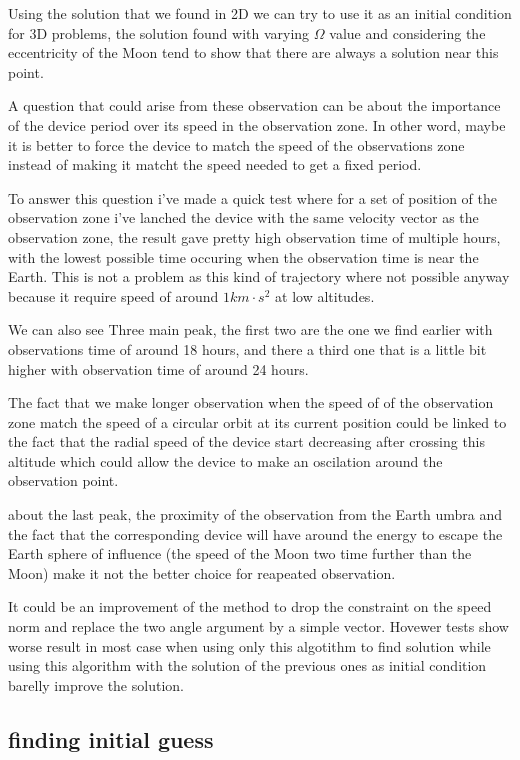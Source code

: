\documentclass{article} %
\begin{document}
		Using the solution that we found in 2D we can try to use it as an initial condition for 3D problems, the solution found with varying $\Omega$ value and considering the eccentricity of the Moon tend to show that there are always a solution near this point.
		
		A question that could arise from these observation can be about the importance of the device period over its speed in the observation zone. In other word, maybe it is better to force the device to match the speed of the observations zone instead of making it matcht the speed needed to get a fixed period.
		
		To answer this question i've made a quick test where for a set of position of the observation zone i've lanched the device with the same velocity vector as the observation zone, the result gave pretty high observation time of multiple hours, with the lowest possible time occuring when the observation time is near the Earth. This is not a problem as this kind of trajectory where not possible anyway because it require speed of around $1 km\cdot s^2$ at low altitudes.
		
		We can also see Three main peak, the first two are the one we find earlier with observations time of around 18 hours, and there a third one that is a little bit higher with observation time of around 24 hours.
		
		The fact that we make longer observation when the speed of of the observation zone match the speed of a circular orbit at its current position could be linked to the fact that the radial speed of the device start decreasing after crossing this altitude which could allow the device to make an oscilation around the observation point.
		
		about the last peak, the proximity of the observation from the Earth umbra and the fact that the corresponding device will have around the energy to escape the Earth sphere of influence (the speed of the Moon two time further than the Moon) make it not the better choice for reapeated observation.
		
		It could be an improvement of the method to drop the constraint on the speed norm and replace the two angle argument by a simple vector. Hovewer tests show worse result in most case when using only this algotithm to find solution while using this algorithm with the solution of the previous ones as initial condition barelly improve the solution.
		
		\subsection{finding initial guess}
		
\end{document}
